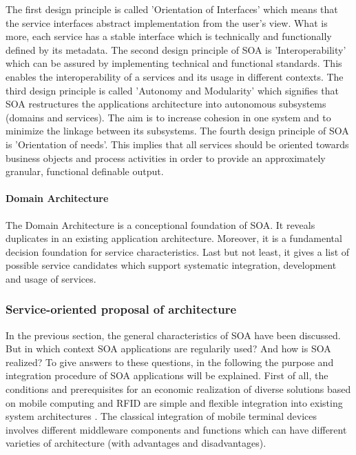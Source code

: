 The first design principle is called 'Orientation of Interfaces' which means that the service interfaces abstract implementation from the user's view. What is more, each service has a stable interface which is technically and functionally defined by its metadata. The second design principle of SOA is 'Interoperability' which can be assured by implementing technical and functional standards. This enables the interoperability of a services and its usage in different contexts. The third design principle is called 'Autonomy and Modularity' which signifies that SOA restructures the applications architecture into autonomous subsystems (domains and services). The aim is to increase cohesion in one system and to minimize the linkage between its subsystems. The fourth design principle of SOA is 'Orientation of needs'. This implies that all services should be oriented towards business objects and process activities in order to provide an approximately granular, functional definable output. 

\paragraph{Domain Architecture}

The Domain Architecture is a conceptional foundation of SOA. It reveals duplicates in an existing application architecture. Moreover, it is a fundamental decision foundation for service characteristics. Last but not least, it gives a list of possible service candidates which support systematic integration, development and usage of services.

\subsubsection{Service-oriented proposal of architecture}

In the previous section, the general characteristics of SOA have been discussed. But in which context SOA applications are regularily used? And how is SOA realized? To give answers to these questions, in the following the purpose and integration procedure of SOA applications will be explained. 
First of all, the conditions and prerequisites for an economic realization of diverse solutions based on mobile computing and RFID are simple and flexible integration into existing system architectures \cite[p.133 ff.]{mobile}. The classical integration of mobile terminal devices involves different middleware components and functions which can have different varieties of architecture (with advantages and disadvantages). 

